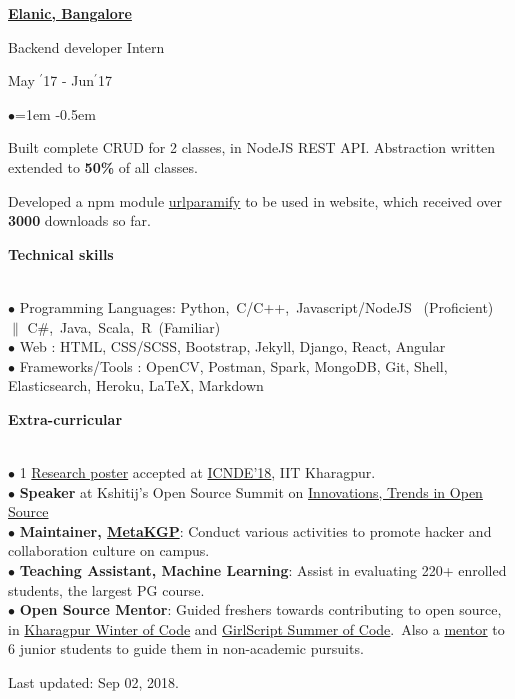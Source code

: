\documentclass[11pt, a4paper]{resume}
\newcommand{\important}[1]{
  \textcolor{mypurple}{#1}
}
\newcommand{\fillit}[1]{
  \leavevmode\xleaders\hbox{#1}\hfill\kern0pt
}
\newcommand{\sectionTitle}[1]{
  \begin{Large}
      \important{\textbf{#1}} 
    \end{Large}
    \important{\rlap{\rule[.5ex]{\linegoal}{0.5pt}}{}}
     \vspace{0.1em}\\
}
\newcommand{\textbox}[1]{
  \parbox{.333\textwidth}{#1}
}
\newenvironment{Jobsection}[3]{ %
\noindent\textbox{\bf #1\hfill}\textbox{\hfil #2\hfil}\textbox{\hfill #3}
  \begin{list}{$\bullet$}{\leftmargin=1em} %
   \itemsep -0.5em \vspace{-0.5em} %
  }{
  \end{list}
  \vspace{0.2em} %
}
\begin{document}
\begin{Jobsection}{\href{https://drive.google.com/file/d/0B5iU6cWw36rOVWZIcllPY3RSd2c/view?usp=sharing}{Elanic, Bangalore}}{Backend developer Intern}{ May $^{\prime}$17 - Jun$^{\prime}$17}
\item Built complete CRUD for 2 classes, in NodeJS REST API. Abstraction written extended to {\bf 50\%} of all classes.
\item Developed a npm module \href{https://www.npmjs.com/package/urlparamify}{urlparamify} to be used in website, which received over {\bf 3000} downloads so far.
\end{Jobsection}

\sectionTitle{Technical skills}
$\bullet$ Programming Languages: Python,\, C/C++,\, Javascript/NodeJS \, (Proficient)\, $\|$ C\#,\, Java,\, Scala,\, R\, (Familiar) \\
$\bullet$ Web : HTML, CSS/SCSS, Bootstrap, Jekyll, Django, React, Angular \\
$\bullet$  Frameworks/Tools
: OpenCV, Postman, Spark, MongoDB, Git, Shell, Elasticsearch, Heroku, LaTeX, Markdown

\sectionTitle{Extra-curricular}
$\bullet$ 1 \href{https://drive.google.com/file/d/1fCH2AAAHWp5JLwQxLNGoOYoGnyWrolHf/view?usp=sharing}{Research poster} accepted at \href{http://cse.iitkgp.ac.in/conf/NSDE/sds/ICNDE2018/pages/selected.html}{ICNDE'18}, IIT Kharagpur. \\
$\bullet$ {\bf Speaker} at Kshitij's Open Source Summit on \href{https://www.youtube.com/watch?v=lk4ciY3NSbA}{Innovations, Trends in Open Source}\\
$\bullet$ {\bf Maintainer, \href{http://metakgp.github.io}{MetaKGP}}: Conduct various activities to promote hacker and collaboration culture on campus.\\
$\bullet$ {\bf Teaching Assistant, Machine Learning}: Assist in evaluating 220+ enrolled students, the largest PG course.\\
$\bullet$ {\bf Open Source Mentor}: Guided freshers towards contributing to open source, in \href{https://kwoc.kossiitkgp.in/}{Kharagpur Winter of Code} and \href{https://gssoc.tech/projects.html#facebook-archive}{GirlScript Summer of Code}.\, Also a \href{https://drive.google.com/file/d/0B5iU6cWw36rOc0gzcjZPRTd5SkU/view?usp=sharing}{mentor} to 6 junior students to guide them in non-academic pursuits.

  \vspace*{\fill}
    \vspace{-0.63em}
  \begin{flushright}
  \scriptsize Last updated: Sep 02, 2018.
  \end{flushright}
\end{document}
